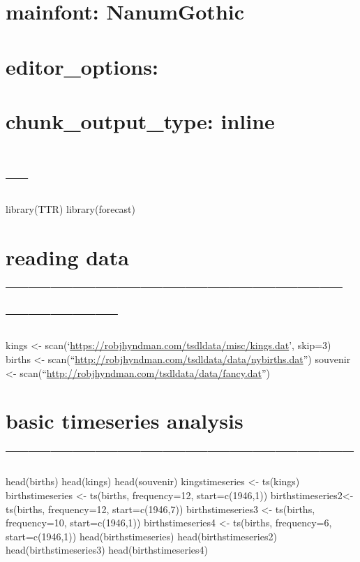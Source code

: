 \documentclass[]{article}
\newenvironment{Shaded}{\begin{snugshade}}{\end{snugshade}}
\newcommand{\KeywordTok}[1]{\textcolor[rgb]{0.13,0.29,0.53}{\textbf{#1}}}
\newcommand{\DataTypeTok}[1]{\textcolor[rgb]{0.13,0.29,0.53}{#1}}
\newcommand{\StringTok}[1]{\textcolor[rgb]{0.31,0.60,0.02}{#1}}
\newcommand{\OperatorTok}[1]{\textcolor[rgb]{0.81,0.36,0.00}{\textbf{#1}}}
\newcommand{\NormalTok}[1]{#1}
\begin{document}
\section{mainfont: NanumGothic}\label{mainfont-nanumgothic}

\section{editor\_options:}\label{editor_options}

\section{chunk\_output\_type: inline}\label{chunk_output_type-inline}

\section{---}\label{section-1}

\begin{Shaded}
\end{Shaded}

library(TTR) library(forecast)

\section{reading data
------------------------------------------------------------}\label{reading-data}

kings \textless{}-
scan(`\url{https://robjhyndman.com/tsdldata/misc/kings.dat}', skip=3)
births \textless{}-
scan(``\url{http://robjhyndman.com/tsdldata/data/nybirths.dat}'')
souvenir \textless{}-
scan(``\url{http://robjhyndman.com/tsdldata/data/fancy.dat}'')

\section{basic timeseries analysis
-----------------------------------------------}\label{basic-timeseries-analysis}

head(births) head(kings) head(souvenir) kingstimeseries \textless{}-
ts(kings) birthstimeseries \textless{}- ts(births, frequency=12,
start=c(1946,1)) birthstimeseries2\textless{}- ts(births, frequency=12,
start=c(1946,7)) birthstimeseries3 \textless{}- ts(births, frequency=10,
start=c(1946,1)) birthstimeseries4 \textless{}- ts(births, frequency=6,
start=c(1946,1)) head(birthstimeseries) head(birthstimeseries2)
head(birthstimeseries3) head(birthstimeseries4)
\end{document}
